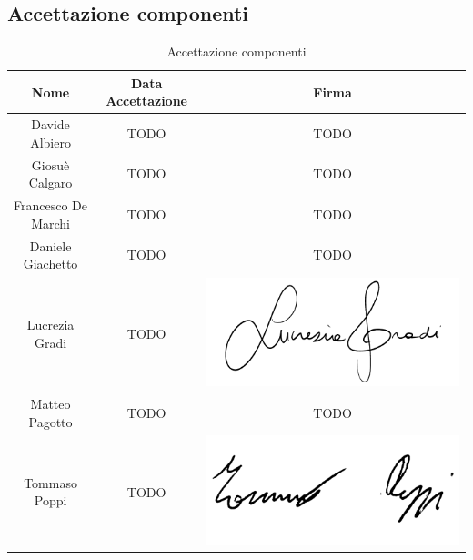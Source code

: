 \subsection{Accettazione componenti}

\renewcommand{\arraystretch}{1}
	\begin{table}[H]
		\begin{center}
			\setlength{\aboverulesep}{0pt}
			\setlength{\belowrulesep}{0pt}
			\setlength{\extrarowheight}{.75ex}
			\begin{tabular}{ c c c}
				\rowcolor{AzzurroGruppo!30} 
				\textbf{Nome} & \textbf{Data Accettazione} & \textbf{Firma} \\
				\toprule
				Davide Albiero & TODO & TODO \\
                Giosuè Calgaro & TODO & TODO \\
                Francesco De Marchi & TODO & TODO \\
                Daniele Giachetto & TODO & TODO \\
                Lucrezia Gradi & TODO & \includegraphics[scale = 0.5]{components/img/firme_membri/firma-lg.png} \\
				Matteo Pagotto & TODO & TODO \\
                Tommaso Poppi & TODO & \includegraphics[scale = 0.5]{components/img/firme_membri/firma-tp.png} \\
				\bottomrule
			\end{tabular}
			\caption{Accettazione componenti}
		\end{center}
    \end{table}

